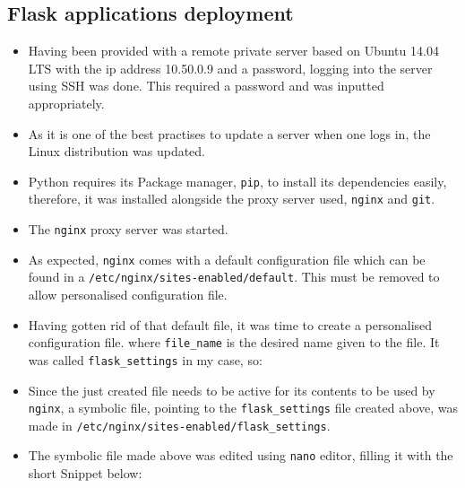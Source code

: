 \subsection{Flask applications deployment}
\begin{itemize}
	\item Having been provided with a remote private server based on Ubuntu 14.04 LTS with the ip address 10.50.0.9 and a password, logging into the server using \ac{SSH} was done.
	This required a password and was inputted appropriately.
	\item As it is one of the best practises to update a server when one logs in, the Linux distribution was updated.
	\item Python requires its Package manager, \texttt{pip}, to install its dependencies easily, therefore, it was installed alongside the proxy server used, \texttt{nginx} and \texttt{git}.
	\item The \texttt{nginx} proxy server was started.
	\item As expected, \texttt{nginx} comes with a default configuration file which can be found in a \texttt{/etc/nginx/sites-enabled/default}. This must be removed to allow personalised configuration file.
	\item Having gotten rid of that default file, it was time to create a personalised configuration file.
	where \texttt{file_name} is the desired name given to the file. It was called \texttt{flask_settings} in my case, so:
	\item Since the just created file needs to be active for its contents to be used by \texttt{nginx}, a symbolic file, pointing to the \texttt{flask_settings} file created above, was made in \texttt{/etc/nginx/sites-enabled/flask_settings}.
	\item The symbolic file made above was edited using \texttt{nano} editor, filling it with the short Snippet below:

\end{itemize}
